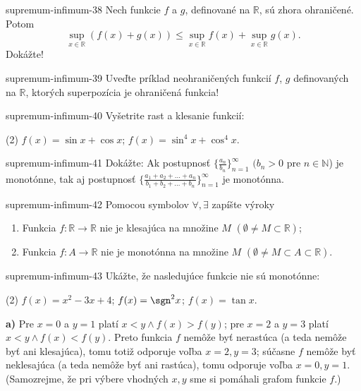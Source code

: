\begin{defproblem}{supremum-infimum-38}
Nech funkcie $f$ a $g$, definované na $\mathbb{R}$, sú zhora ohraničené. Potom
$$\sup_{x\in\mathbb{R}}(f(x)+g(x))\leq\sup_{x\in\mathbb{R}}f(x)+\sup_{x\in\mathbb{R}}g(x).$$
Dokážte!
\end{defproblem}

\begin{defproblem}{supremum-infimum-39}
Uveďte príklad neohraničených funkcií $f$, $g$ definovaných na $\mathbb{R}$,
ktorých superpozícia je ohraničená funkcia!
\end{defproblem}

\begin{defproblem}{supremum-infimum-40}
Vyšetrite rast a klesanie funkcií:
\begin{tasks}(2)
  \task $f(x)=\sin x +\cos x$;
  \task $f(x)=\sin^4 x +\cos^4 x$.
\end{tasks}
\end{defproblem}

\begin{defproblem}{supremum-infimum-41}
Dokážte: Ak postupnosť $\{\frac{a_n}{b_n}\}_{n=1}^\infty$ $(b_n>0$ pre $n\in\mathbb{N}$) je monotónne, tak aj postupnosť $\{\frac{a_1+a_2+...+a_n}{b_1+b_2+...+b_n}\}_{n=1}^\infty$ je monotónna.
\end{defproblem}

\begin{defproblem}{supremum-infimum-42}
Pomocou symbolov $\forall,\exists$ zapíšte výroky
\begin{enumerate}
\item Funkcia $f:\mathbb{R}\rightarrow\mathbb{R}$ nie je klesajúca na množine $M$ $(\emptyset \neq M\subset\mathbb{R})$;
\item Funkcia $f:A \rightarrow\mathbb{R}$ nie je monotónna na množine $M$ $(\emptyset \neq M\subset A \subset\mathbb{R})$.
\end{enumerate}
\end{defproblem}

\begin{defproblem}{supremum-infimum-43}
Ukážte, že nasledujúce funkcie nie sú monotónne:
\begin{tasks}(2)
  \task $f(x) = x^2 - 3x + 4$;
  \task $f(x) = \sgn^2 x$;
  \task $f(x) = \tan x$.
\end{tasks}

\begin{solution}
  \textbf{a)}
  Pre $x=0$ a $y=1$ platí $x<y\wedge f(x)>f(y)$; pre $x=2$ a $y=3$ platí
  $x<y\wedge f(x)<f(y)$. Preto funkcia $f$ nemôže byť nerastúca (a teda nemôže
  byť ani klesajúca), tomu totiž odporuje voľba $x=2,y=3$; súčasne $f$ nemôže byť
  neklesajúca (a teda nemôže byť ani rastúca), tomu odporuje voľba $x=0,y=1$.
  (Samozrejme, že pri výbere vhodných $x,y$ sme si pomáhali grafom funkcie $f$.)
  \end{solution}
\end{defproblem}

